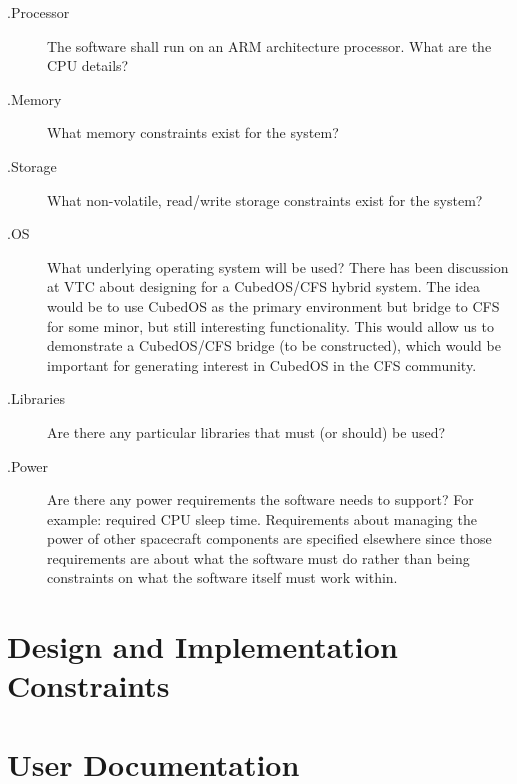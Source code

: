 \begin{description}
\item[{\varenv}.Processor] The software shall run on an ARM
  architecture processor.  What are the CPU details?
\item[{\varenv}.Memory] What memory constraints exist for the system?
\item[{\varenv}.Storage] What non-volatile, read/write storage
  constraints exist for the system?
\item[{\varenv}.OS] What underlying operating system will be used?
  There has been discussion at VTC about designing for a CubedOS/CFS
  hybrid system. The idea would be to use CubedOS as the primary
  environment but bridge to CFS for some minor, but still interesting
  functionality. This would allow us to demonstrate a CubedOS/CFS
  bridge (to be constructed), which would be important for generating
  interest in CubedOS in the CFS community.
\item[{\varenv}.Libraries] Are there any particular libraries that
  must (or should) be used?
\item[{\varenv}.Power] Are there any power requirements the software
  needs to support? For example: required CPU sleep time. Requirements
  about managing the power of other spacecraft components are
  specified elsewhere since those requirements are about what the
  software must do rather than being constraints on what the software
  itself must work within.
\end{description}

\section{Design and Implementation Constraints}

\section{User Documentation}

